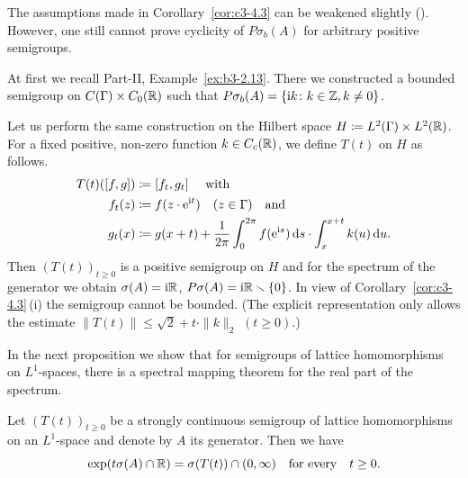 The assumptions made in Corollary~\ref{cor:c3-4.3} can be weakened slightly (\cf \textcite{greiner:1982}). 
However, one still cannot prove cyclicity of\/ $P\sigma_{b}(A)$ for arbitrary positive semigroups.
\begin{example}\label{ex:c3-4.4}
	At first we recall Part-II, Example~\ref{ex:b3-2.13}. 
	There we constructed a bounded semigroup on $C(\Gamma)\times C_{0}(\mathbb{R} )$ such that $P\sigma_{b}(A) = \{\mathrm{i} k \colon k \in \mathbb{Z}, k \neq 0\}$.

    Let us perform the same construction on the Hilbert space
    $H \coloneq L^2(\Gamma)\times L^2(\mathbb{R} )$.
    For a fixed positive, non-zero function $k \in C_c(\mathbb{R} )$,
    we define $T(t)$ on $H$ as follows.
\begin{equation}\label{eq:c3-4.6}
	\begin{split} 
		T(t)([f,g]) &\coloneq [f_t,g_t] \quad \ \text{with}\\
		f_t(z) &\coloneq f(z \cdot \mathrm{e}^{\mathrm{i} t}) \quad (z \in \Gamma) \quad \text{and}\\
		g_t(x) &\coloneq g(x+t) + \frac{1}{2\pi}\int_{0}^{2\pi} f(\mathrm{e}^{\mathrm{i} s}) \mathop{}\!\mathrm{d}{s}  \cdot \int_{x}^{x+t} k(u) \mathop{}\!\mathrm{d}{u}  .
	\end{split}
\end{equation}
Then $(T(t))_{t \geq 0}$ is a positive semigroup on $H$ and for the spectrum of
the generator we obtain $\sigma(A) = \mathrm{i}\mathbb{R} $, $P\sigma(A) = \mathrm{i}\mathbb{R} \smallsetminus\{0\}$.
In view of Corollary~\ref{cor:c3-4.3}\,(i) the semigroup cannot be bounded.
(The explicit representation  only allows the estimate $\|T(t)\| \leq \sqrt{2} + t \cdot \|k\|_2$ $(t\geq 0)$.)
\end{example}
In the next proposition we show that for semigroups of lattice homomorphisms on $L^1$-spaces, there is a spectral mapping theorem for the real part of the spectrum.
\begin{proposition}\label{prop:c3-4.5}
Let $(T(t))_{t \geq 0}$ be a strongly continuous semigroup
of lattice homomorphisms on an $L^1$-space and denote by $A$ its generator.
Then we have
\begin{equation}\label{eq:c3-4.7}
	\exp(t\sigma(A) \cap \R ) = \sigma(T(t)) \cap (0,\infty) \quad \text{for every} \quad t \geq 0 .
\end{equation}
\end{proposition}
